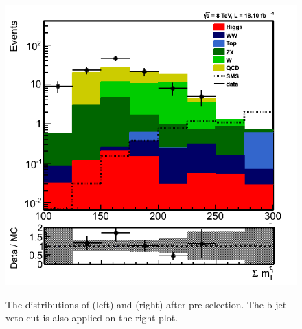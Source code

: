 \begin{figure}[htbp]
\includegraphics[angle=0,scale=0.35]{QCDbginTauTau/Bin2_QCDdatadriven_Smaesign.png} \\
\caption{The distributions of \mttwo (left) and \SumMT (right) after pre-selection. The b-jet veto cut is also applied on the right plot.}
\label{fig:comparison}
\end{figure}
